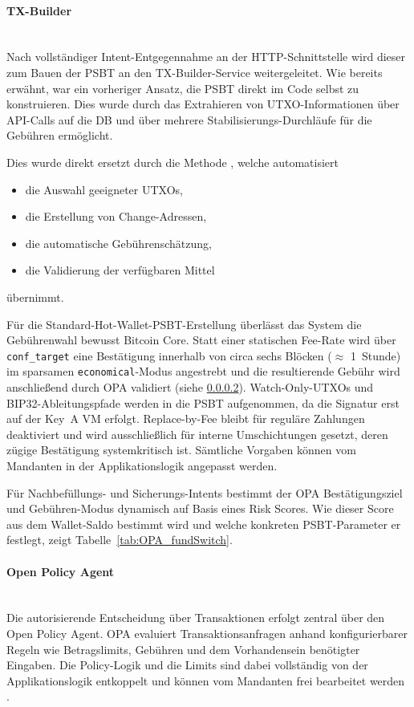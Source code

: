 \paragraph{TX-Builder} \mbox{}\\
Nach vollständiger Intent-Entgegennahme an der \ac{HTTP}-Schnittstelle wird dieser zum Bauen der \ac{PSBT} an den TX-Builder-Service weitergeleitet.
Wie bereits erwähnt, war ein vorheriger Ansatz, die \ac{PSBT} direkt im Code selbst zu konstruieren. Dies wurde durch das Extrahieren von \ac{UTXO}-Informationen über \ac{API}-Calls auf die \ac{DB} und über mehrere Stabilisierungs-Durchläufe für die Gebühren ermöglicht.

Dies wurde direkt ersetzt durch die Methode  \cite{bitcoincore_walletcreatefundedpsbt}, welche automatisiert
\begin{itemize}
    \item die Auswahl geeigneter \acp{UTXO},
    \item die Erstellung von Change-Adressen,
    \item die automatische Gebührenschätzung,
    \item die Validierung der verfügbaren Mittel
\end{itemize}
übernimmt.

Für die Standard-Hot-Wallet-\ac{PSBT}-Erstellung überlässt das System die Gebührenwahl bewusst Bitcoin Core. 
Statt einer statischen Fee-Rate wird über
\texttt{conf\_target} eine Bestätigung innerhalb von circa sechs Blöcken ($\approx$ 1~Stunde) im sparsamen \texttt{economical}-Modus angestrebt und die
resultierende Gebühr wird anschließend durch \ac{OPA} validiert (siehe \ref{sec:opa}). 
Watch-Only-\acp{UTXO} und \ac{BIP}32-Ableitungspfade werden in die \ac{PSBT} aufgenommen, da die Signatur erst auf der Key~A \ac{VM} erfolgt.
Replace-by-Fee \cite{bip125} bleibt für reguläre Zahlungen deaktiviert und wird ausschließlich für interne Umschichtungen gesetzt, deren zügige Bestätigung systemkritisch ist. 
Sämtliche Vorgaben können vom Mandanten in der Applikationslogik angepasst werden.

Für Nachbefüllungs- und Sicherungs-Intents bestimmt der \ac{OPA} Bestätigungsziel und Gebühren-Modus dynamisch auf Basis eines Risk Scores.
Wie dieser Score aus dem Wallet-Saldo bestimmt wird und welche konkreten \ac{PSBT}-Parameter er festlegt, zeigt Tabelle~\ref{tab:OPA_fundSwitch}.

\paragraph{Open Policy Agent} \label{sec:opa} \mbox{}\\
Die autorisierende Entscheidung über Transaktionen erfolgt zentral über den Open Policy Agent. \ac{OPA} evaluiert Transaktionsanfragen anhand konfigurierbarer Regeln wie Betragslimits, Gebühren und dem Vorhandensein benötigter Eingaben. Die Policy-Logik und die Limits sind dabei vollständig von der Applikationslogik entkoppelt und können vom Mandanten frei bearbeitet werden \cite{opa_docs,opa_microservices}.


